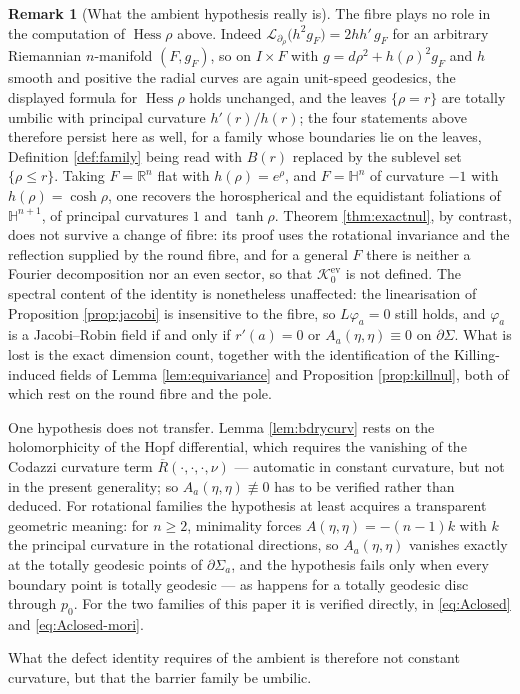 \documentclass[11pt,a4paper]{amsart}
\theoremstyle{plain}
\theoremstyle{definition}
\newtheorem{remark}[theorem]{Remark}
\newcommand{\R}{\mathbb{R}}
\newcommand{\Hyp}{\mathbb{H}}
\newcommand{\Hess}{\operatorname{Hess}}
\newcommand{\Ker}{\mathcal{K}}
\begin{document}
\begin{remark}[What the ambient hypothesis really is]
The fibre plays no role in the computation of $\Hess\rho$ above. Indeed $\mathcal L_{\partial_\rho}\bigl(h^{2}g_{F}\bigr)=2hh'\,g_{F}$ for an arbitrary Riemannian $n$-manifold $(F,g_{F})$, so on $I\times F$ with $g=d\rho^{2}+h(\rho)^{2}g_{F}$ and $h$ smooth and positive the radial curves are again unit-speed geodesics, the displayed formula for $\Hess\rho$ holds
unchanged, and the leaves $\{\rho=r\}$ are totally umbilic with principal curvature $h'(r)/h(r)$; the four statements above therefore persist here as well, for a family whose boundaries lie on the leaves, Definition \ref{def:family} being read with $B(r)$ replaced by the sublevel set
$\{\rho\le r\}$. Taking $F=\R^{n}$ flat with $h(\rho)=e^{\rho}$, and $F=\Hyp^{n}$ of curvature $-1$ with $h(\rho)=\cosh\rho$, one recovers the horospherical and the equidistant foliations of $\Hyp^{n+1}$, of principal curvatures $1$ and $\tanh\rho$. Theorem \ref{thm:exactnul}, by contrast, does not survive a change of fibre: its proof uses the rotational invariance and the reflection supplied by the round fibre, and for a general $F$ there is neither a Fourier decomposition nor an even sector, so that $\Ker_0^{\mathrm{ev}}$ is not defined. The spectral content of the identity is nonetheless unaffected: the linearisation of Proposition \ref{prop:jacobi} is insensitive to the fibre, so $L\varphi_a=0$ still holds, and $\varphi_a$ is a Jacobi--Robin field if and only if $r'(a)=0$ or $A_a(\eta,\eta)\equiv 0$ on $\partial\Sigma$. What is lost is the exact dimension count, together with the identification of the Killing-induced fields of Lemma \ref{lem:equivariance} and Proposition \ref{prop:killnul}, both of which rest on the round fibre and the pole.

One hypothesis does not transfer. Lemma  \ref{lem:bdrycurv} rests on the holomorphicity of the Hopf differential, which requires the vanishing of the Codazzi curvature term $\overline R(\cdot,\cdot,\cdot,\nu)$ --- automatic in constant curvature, but not in the present generality; so $A_a(\eta,\eta)\not\equiv 0$ has to be verified rather than deduced. For rotational families the hypothesis at least acquires a transparent geometric meaning: for $n\geq 2$, minimality forces $A(\eta,\eta)=-(n-1)k$ with $k$ the principal curvature in the rotational directions, so $A_a(\eta,\eta)$ vanishes exactly at the totally geodesic points of $\partial\Sigma_a$, and the hypothesis fails only when every boundary point is totally geodesic --- as happens for a totally geodesic disc through $p_0$. For the two families of this paper it is verified directly, in \eqref{eq:Aclosed} and \eqref{eq:Aclosed-mori}.

What the defect identity requires of the ambient is therefore not constant curvature, but that the barrier family be umbilic.
\end{remark}
\end{document}

